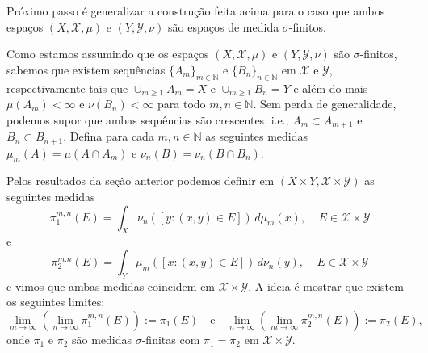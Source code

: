 Próximo passo é generalizar a construção feita
acima para o caso que ambos espaços 
$(X,\mathscr{X},\mu)$ e $(Y,\mathscr{Y},\nu)$
são espaços de medida $\sigma$-finitos.

Como estamos assumindo que os espaços 
$(X,\mathscr{X},\mu)$ e $(Y,\mathscr{Y},\nu)$
são $\sigma$-finitos, sabemos 
que existem sequências $\{A_m\}_{m\in\mathbb{N}}$
e $\{B_n\}_{n\in\mathbb{N} }$ em $\mathscr{X}$ e $\mathscr{Y}$, respectivamente 
tais que $\cup_{m\geq 1} A_m=X$ e 
$\cup_{m\geq 1} B_n = Y$ e além do mais $\mu(A_m)<\infty$
e $\nu(B_n)<\infty$ para todo $m,n\in\mathbb{N}$.
Sem perda de generalidade, podemos supor que ambas sequências
são crescentes, i.e., $A_{m}\subset A_{m+1}$ e
$B_{n}\subset B_{n+1}$. 
Defina para cada $m,n\in\mathbb{N}$ as seguintes 
medidas $\mu_m(A)=\mu(A\cap A_m)$ e 
$\nu_n(B)=\nu_n(B\cap B_n)$.

Pelos resultados da seção anterior podemos definir em
$(X\times Y,\mathscr{X}\times\mathscr{Y})$ as seguintes
medidas
\begin{equation}\label{M.Prod.1mn}
\pi_1^{m,n}(E)
=
\int_X \nu_n([y:(x,y)\in E ])\, d\mu_m(x),~~~~~E \in \mathscr{X}\times \mathscr{Y}
\end{equation}
e 
\begin{equation}\label{M. Prod.2mn}
\pi_2^{m.n}(E)
=
\int_Y \mu_m([x:(x,y)\in E ])\, d\nu_n(y),~~~~~E \in \mathscr{X}\times \mathscr{Y}
\end{equation}
e vimos que ambas medidas coincidem em 
$\mathscr{X}\times \mathscr{Y}$.
A ideia é mostrar que existem os seguintes limites:
\[
\lim_{m\to\infty}
\left( \lim_{n\to\infty} \pi_1^{m,n}(E) \right)
:=\pi_1(E)
\quad\text{e}\quad
\lim_{n\to\infty}
\left( \lim_{m\to\infty} \pi_2^{m,n}(E) \right)
:=\pi_2(E),
\]
onde $\pi_1$ e $\pi_2$ são medidas $\sigma$-finitas 
com $\pi_1=\pi_2$ em $\mathscr{X}\times\mathscr{Y}$.


